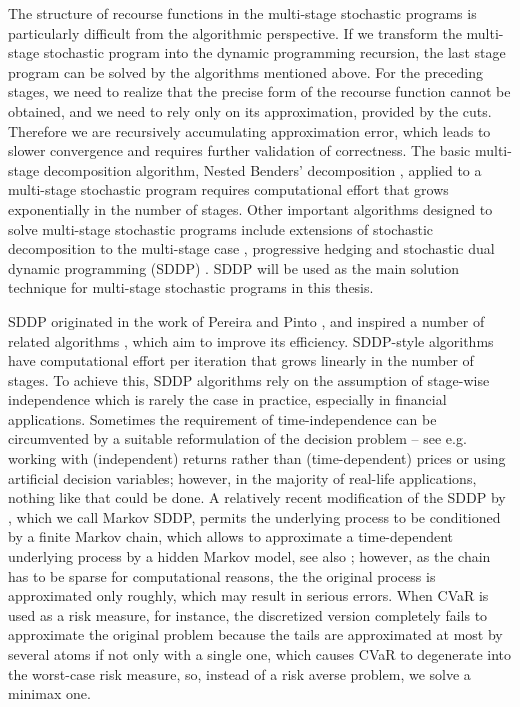\documentclass{article}              %
\begin{document}
The structure of recourse functions in the multi-stage stochastic programs is particularly difficult from the algorithmic perspective. If we transform the multi-stage stochastic program into the dynamic programming recursion, the last stage program can be solved by the algorithms mentioned above. For the preceding stages, we need to realize that the precise form of the recourse function cannot be obtained, and we need to rely only on its approximation, provided by the cuts. Therefore we are recursively accumulating approximation error, which leads to slower convergence and requires further validation of correctness. The basic multi-stage decomposition algorithm, Nested Benders' decomposition  \cite{birge_85}, applied to a multi-stage stochastic program requires computational effort that grows exponentially  in the number of stages. Other important algorithms designed to solve multi-stage stochastic programs include extensions of stochastic decomposition to the multi-stage case \cite{stochdecomp,sen_zhou_2012}, progressive hedging \cite{rockafellar_wets_91} and stochastic dual dynamic programming (SDDP) \cite{pereirapinto}. SDDP will be used as the main solution technique for multi-stage stochastic programs in this thesis.

SDDP originated in the work of Pereira and Pinto \cite{pereirapinto}, and inspired a number of related algorithms \cite{chen_powell_99,donohue_birge_06,linowsky_philpott_05,philpott_guan_08}, which aim to improve its efficiency. SDDP-style algorithms have computational effort per iteration that grows linearly in the number of stages. To achieve this, SDDP algorithms rely on the assumption of stage-wise independence which is rarely
the case in practice, especially in financial applications. Sometimes
the requirement of time-independence can be circumvented by a suitable
reformulation of the decision problem -- see e.g. \cite{kozmik2014evaluating}
working with (independent) returns rather than (time-dependent) prices or \cite{lohndorf2019modeling} using artificial decision variables;
however, in the majority of real-life applications, nothing like that
could be done. A relatively recent modification of the SDDP
by \cite{philpott2013solving}, which we call Markov SDDP, permits the
underlying process to be conditioned by a finite Markov chain, which 
allows to approximate a time-dependent underlying process by a hidden
Markov model, see also \cite{lohndorf2019modeling}; however, as the chain has to be sparse for computational
reasons, the the original process is approximated only
roughly, which may result in serious errors. When CVaR is used as a risk measure, for instance, the discretized version completely fails to approximate the original problem because the tails are approximated at most by several atoms if not only with a single one, which causes CVaR to degenerate into the worst-case risk measure, so, instead of a risk averse problem, we solve a minimax one. 
\end{document}
